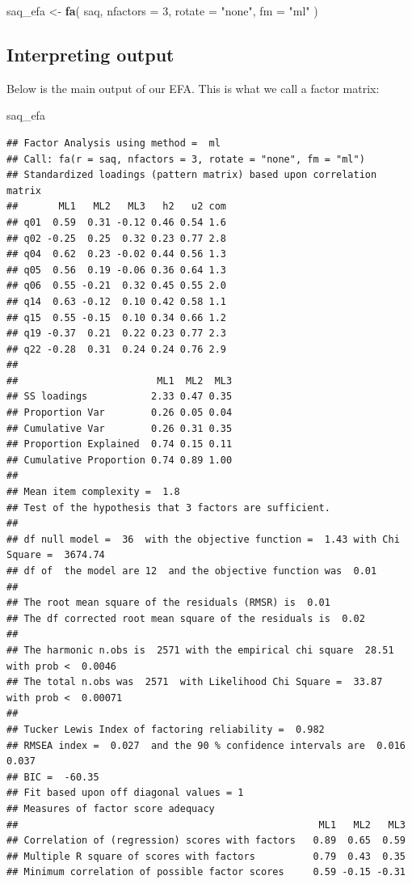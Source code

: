 \documentclass[
]{book}
\newenvironment{Shaded}{\begin{snugshade}}{\end{snugshade}}
\newcommand{\AttributeTok}[1]{\textcolor[rgb]{0.13,0.29,0.53}{#1}}
\newcommand{\DecValTok}[1]{\textcolor[rgb]{0.00,0.00,0.81}{#1}}
\newcommand{\FunctionTok}[1]{\textcolor[rgb]{0.13,0.29,0.53}{\textbf{#1}}}
\newcommand{\NormalTok}[1]{#1}
\newcommand{\OtherTok}[1]{\textcolor[rgb]{0.56,0.35,0.01}{#1}}
\newcommand{\StringTok}[1]{\textcolor[rgb]{0.31,0.60,0.02}{#1}}
\begin{document}
\begin{Shaded}
\begin{Highlighting}[]
\NormalTok{saq\_efa }\OtherTok{\textless{}{-}} \FunctionTok{fa}\NormalTok{(}
\NormalTok{  saq,}
  \AttributeTok{nfactors =} \DecValTok{3}\NormalTok{,}
  \AttributeTok{rotate =} \StringTok{"none"}\NormalTok{,}
  \AttributeTok{fm =} \StringTok{"ml"}
\NormalTok{)}
\end{Highlighting}
\end{Shaded}

\subsection{Interpreting output}\label{interpreting-output-1}

Below is the main output of our EFA. This is what we call a factor matrix:

\begin{Shaded}
\begin{Highlighting}[]
\NormalTok{saq\_efa}
\end{Highlighting}
\end{Shaded}

\begin{verbatim}
## Factor Analysis using method =  ml
## Call: fa(r = saq, nfactors = 3, rotate = "none", fm = "ml")
## Standardized loadings (pattern matrix) based upon correlation matrix
##       ML1   ML2   ML3   h2   u2 com
## q01  0.59  0.31 -0.12 0.46 0.54 1.6
## q02 -0.25  0.25  0.32 0.23 0.77 2.8
## q04  0.62  0.23 -0.02 0.44 0.56 1.3
## q05  0.56  0.19 -0.06 0.36 0.64 1.3
## q06  0.55 -0.21  0.32 0.45 0.55 2.0
## q14  0.63 -0.12  0.10 0.42 0.58 1.1
## q15  0.55 -0.15  0.10 0.34 0.66 1.2
## q19 -0.37  0.21  0.22 0.23 0.77 2.3
## q22 -0.28  0.31  0.24 0.24 0.76 2.9
## 
##                        ML1  ML2  ML3
## SS loadings           2.33 0.47 0.35
## Proportion Var        0.26 0.05 0.04
## Cumulative Var        0.26 0.31 0.35
## Proportion Explained  0.74 0.15 0.11
## Cumulative Proportion 0.74 0.89 1.00
## 
## Mean item complexity =  1.8
## Test of the hypothesis that 3 factors are sufficient.
## 
## df null model =  36  with the objective function =  1.43 with Chi Square =  3674.74
## df of  the model are 12  and the objective function was  0.01 
## 
## The root mean square of the residuals (RMSR) is  0.01 
## The df corrected root mean square of the residuals is  0.02 
## 
## The harmonic n.obs is  2571 with the empirical chi square  28.51  with prob <  0.0046 
## The total n.obs was  2571  with Likelihood Chi Square =  33.87  with prob <  0.00071 
## 
## Tucker Lewis Index of factoring reliability =  0.982
## RMSEA index =  0.027  and the 90 % confidence intervals are  0.016 0.037
## BIC =  -60.35
## Fit based upon off diagonal values = 1
## Measures of factor score adequacy             
##                                                    ML1   ML2   ML3
## Correlation of (regression) scores with factors   0.89  0.65  0.59
## Multiple R square of scores with factors          0.79  0.43  0.35
## Minimum correlation of possible factor scores     0.59 -0.15 -0.31
\end{verbatim}
\end{document}
